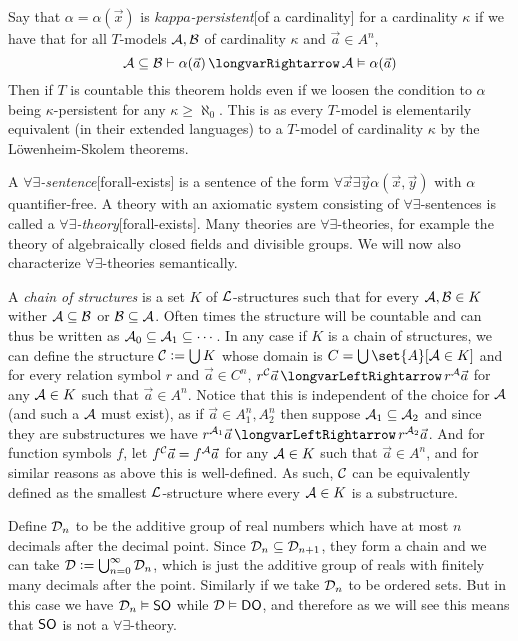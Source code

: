 Say that $\alpha=\alpha(\vec x)$ is {\it $kappa$-persistent}[of a cardinality] for a cardinality $\kappa$ if we have that for all $T$-models ${\cal A},{\cal B}$ of
cardinality $\kappa$ and $\vec a\in A^n$,
$$ {\cal A}\subseteq{\cal B}\vdash\alpha(\vec a)\implies{\cal A}\vDash\alpha(\vec a) $$
Then if $T$ is countable this theorem holds even if we loosen the condition to $\alpha$ being $\kappa$-persistent for any $\kappa\geq\aleph_0$.
This is as every $T$-model is elementarily equivalent (in their extended languages) to a $T$-model of cardinality $\kappa$ by the L\"owenheim-Skolem theorems.

A {\it $\forall\exists$-sentence}[forall-exists] is a sentence of the form $\forall\vec x\exists\vec y\alpha(\vec x,\vec y)$ with $\alpha$ quantifier-free.
A theory with an axiomatic system consisting of $\forall\exists$-sentences is called a {\it $\forall\exists$-theory}[forall-exists].
Many theories are $\forall\exists$-theories, for example the theory of algebraically closed fields and divisible groups.
We will now also characterize $\forall\exists$-theories semantically.

A {\it chain of structures} is a set $K$ of ${\cal L}$-structures such that for every ${\cal A},{\cal B}\in K$ wither ${\cal A}\subseteq{\cal B}$ or ${\cal B}\subseteq{\cal A}$.
Often times the structure will be countable and can thus be written as ${\cal A}_0\subseteq{\cal A}_1\subseteq\cdots$.
In any case if $K$ is a chain of structures, we can define the structure ${\cal C}\coloneqq\bigcup K$ whose domain is $C=\bigcup\set{A}[{\cal A}\in K]$ and for every relation symbol $r$ and $\vec a\in C^n$,
$r^{\cal C}\vec a\iff r^{\cal A}\vec a$ for any ${\cal A}\in K$ such that $\vec a\in A^n$.
Notice that this is independent of the choice for ${\cal A}$ (and such a ${\cal A}$ must exist), as if $\vec a\in A_1^n,A_2^n$ then suppose ${\cal A}_1\subseteq{\cal A}_2$ and since they are substructures
we have $r^{{\cal A}_1}\vec a\iff r^{{\cal A}_2}\vec a$.
And for function symbols $f$, let $f^{\cal C}\vec a=f^{\cal A}\vec a$ for any ${\cal A}\in K$ such that $\vec a\in A^n$, and for similar reasons as above this is well-defined.
As such, ${\cal C}$ can be equivalently defined as the smallest ${\cal L}$-structure where every ${\cal A}\in K$ is a substructure.

\bexam[name=sodecimalexam]

    Define ${\cal D}_n$ to be the additive group of real numbers which have at most $n$ decimals after the decimal point.
    Since ${\cal D}_n\subseteq{\cal D}_{n+1}$, they form a chain and we can take ${\cal D}\coloneqq\bigcup_{n=0}^\infty{\cal D}_n$, which is just the additive group of reals with finitely many decimals
    after the point.
    Similarly if we take ${\cal D}_n$ to be ordered sets.
    But in this case we have ${\cal D}_n\vDash{\sf SO}$ while ${\cal D}\vDash{\sf DO}$, and therefore as we will see this means that ${\sf SO}$ is not a $\forall\exists$-theory.

